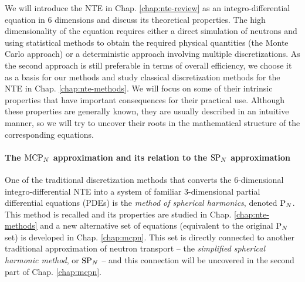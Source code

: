 We will introduce the NTE in Chap. \ref{chap:nte-review} as an integro-differential equation in 6 dimensions and
discuss its theoretical properties. The high dimensionality of the equation requires either a direct simulation of
neutrons and using statistical methods to obtain the required physical quantities (the Monte Carlo approach) or a deterministic approach involving multiple discretizations.
As the second approach is still preferable in terms of overall efficiency, we choose it as a basis for our methods and
study classical discretization methods for the NTE in Chap. \ref{chap:nte-methods}. We will focus on some of
their intrinsic properties that have important consequences for their practical use. Although these properties are
generally known, they are usually described in an intuitive manner, so we will try to uncover their roots in the
mathematical structure of the corresponding equations.

\paragraph{The $\text{MCP}_{N}$ approximation and its relation to the $\text{SP}_{N}$ approximation} 
One of the traditional discretization methods that converts the 6-dimensional integro-differential NTE into a system of
familiar 3-dimensional partial differential equations (PDEs) is the
\textit{method of spherical harmonics}, denoted $\text{P}_{N}$. This method is recalled and its properties are
studied in Chap. \ref{chap:nte-methods} and a new alternative set of equations (equivalent to the original $\text{P}_{N}$ set) is
developed in Chap. \ref{chap:mcpn}. This set is directly connected to another traditional approximation of neutron
transport -- the \textit{simplified spherical harmonic method}, or $\text{SP}_{N}$  -- and this connection will be uncovered in the second part of Chap.
\ref{chap:mcpn}.%

